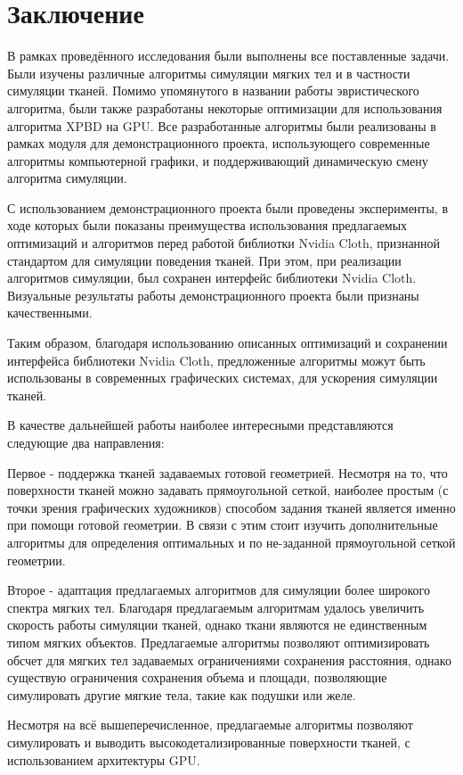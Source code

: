 \chapter*{Заключение} \label{ch-conclusion}
	В рамках проведённого исследования были выполнены все поставленные задачи. Были изучены различные алгоритмы симуляции мягких тел и в частности симуляции тканей. Помимо упомянутого в названии работы эвристического алгоритма, были также разработаны некоторые оптимизации для использования алгоритма XPBD на GPU. Все разработанные алгоритмы были реализованы в рамках модуля для демонстрационного проекта, использующего современные алгоритмы компьютерной графики, и поддерживающий динамическую смену алгоритма симуляции.
	
	С использованием демонстрационного проекта были проведены эксперименты, в ходе которых были показаны преимущества использования предлагаемых оптимизаций и алгоритмов перед работой библиотки Nvidia Cloth, признанной стандартом для симуляции поведения тканей. При этом, при реализации алгоритмов симуляции, был сохранен интерфейс библиотеки Nvidia Cloth. Визуальные результаты работы демонстрационного проекта были признаны качественными. 
	
	Таким образом, благодаря использованию описанных оптимизаций и сохранении интерфейса библиотеки Nvidia Cloth, предложенные алгоритмы можут быть использованы в современных графических системах, для ускорения симуляции тканей. 
	
	В качестве дальнейшей работы наиболее интересными представляются следующие два направления:
	
	Первое - поддержка тканей задаваемых готовой геометрией. Несмотря на то, что поверхности тканей можно задавать прямоугольной сеткой, наиболее простым (с точки зрения графических художников) способом задания тканей является именно при помощи готовой геометрии. В связи с этим стоит изучить дополнительные алгоритмы для определения оптимальных  и  по не-заданной прямоугольной сеткой геометрии.
	
	Второе - адаптация предлагаемых алгоритмов для симуляции более широкого спектра мягких тел. Благодаря предлагаемым алгоритмам удалось увеличить скорость работы симуляции тканей, однако ткани являются не единственным типом мягких объектов. Предлагаемые алгоритмы позволяют оптимизировать обсчет для мягких тел задаваемых ограничениями сохранения расстояния, однако существую ограничения сохранения объема и площади, позволяющие симулировать другие мягкие тела, такие как подушки или желе.
	
	Несмотря на всё вышеперечисленное, предлагаемые алгоритмы позволяют симулировать и выводить высокодетализированные поверхности тканей, с использованием архитектуры GPU.